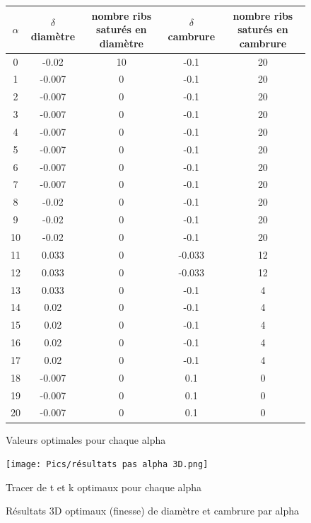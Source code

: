 \begin{figure}[H]
    \centering
    \begin{minipage}[b]{0.45\textwidth}
        \centering
        \begin{tabular}{|c|c|c|c|c|}
            \hline
            \textbf{$\alpha$} & \textbf{\parbox{1.5cm}{\centering $\delta$diamètre}} & \textbf{\parbox{1.5cm}{\centering nombre ribs saturés en diamètre}} & \textbf{\parbox{1.5cm}{\centering $\delta$cambrure}} & \textbf{\parbox{1.5cm}{\centering nombre ribs saturés en cambrure}}\\
            \hline
            0 & -0.02 & 10 & -0.1 & 20\\
            1 & -0.007 & 0 & -0.1 & 20\\
            2 & -0.007 & 0 & -0.1 & 20\\
            3 & -0.007 & 0 & -0.1 & 20 \\
            4 & -0.007 & 0 & -0.1 & 20 \\
            5 & -0.007 & 0 & -0.1 & 20 \\
            6 & -0.007 & 0 & -0.1 & 20  \\
            7 & -0.007 & 0 & -0.1 & 20 \\
            8 & -0.02 & 0 & -0.1 & 20 \\
            9 & -0.02 & 0 & -0.1 & 20 \\
            10 & -0.02 & 0 & -0.1 & 20 \\
            11 & 0.033 & 0 & -0.033 & 12 \\
            12 & 0.033 & 0 & -0.033 & 12 \\
            13 & 0.033 & 0 & -0.1 & 4 \\
            14 & 0.02 & 0 & -0.1 & 4 \\
            15 & 0.02 & 0 & -0.1 & 4 \\
            16 & 0.02 & 0 & -0.1 & 4 \\
            17 & 0.02 & 0 & -0.1 & 4 \\
            18 & -0.007 & 0 & 0.1 & 0 \\
            19 & -0.007 & 0 & 0.1 & 0 \\
            20 & -0.007 & 0 & 0.1 & 0 \\
            \hline
        \end{tabular}
        \caption{Valeurs optimales pour chaque alpha}
        \label{fig:table}
    \end{minipage}
    \hfill 
    \begin{minipage}[b]{0.45\textwidth}
        \centering
        \texttt{[image: Pics/résultats pas alpha 3D.png]}
        \caption{Tracer de t et k optimaux pour chaque alpha}
        \label{fig:graph}
    \end{minipage}
    \caption{Résultats 3D optimaux (finesse) de diamètre et cambrure par alpha}
    \label{fig:opti alpha 3d}
\end{figure}

